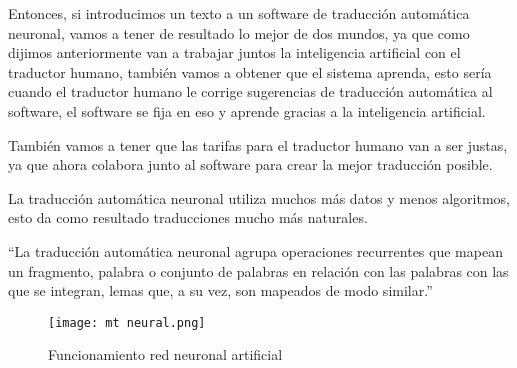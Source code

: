 \documentclass[conference]{IEEEtran}
\begin{document}
Entonces, si introducimos un texto a un software de traducción automática neuronal, vamos a tener de resultado lo mejor de dos mundos, ya que como dijimos anteriormente van a trabajar juntos la inteligencia artificial con el traductor humano, también vamos a obtener que el sistema aprenda, esto sería cuando el traductor humano le corrige sugerencias de traducción automática al software, el software se fija en eso y aprende gracias a la inteligencia artificial.

También vamos a tener que las tarifas para el traductor humano van a ser justas, ya que ahora colabora junto al software para crear la mejor traducción posible.

La traducción automática neuronal utiliza muchos más datos y menos algoritmos, esto da como resultado traducciones mucho más naturales.

“La traducción automática neuronal agrupa operaciones recurrentes que mapean un fragmento, palabra o conjunto de palabras en relación con las palabras con las que se integran, lemas que, a su vez, son mapeados de modo similar.”\cite{b13}

\begin{figure}[htp]
        \centering
        \texttt{[image: mt neural.png]}
        \label{foto}
        \caption{Funcionamiento red neuronal artificial}
    \end{figure}
\vspace{2cm}
\end{document}
